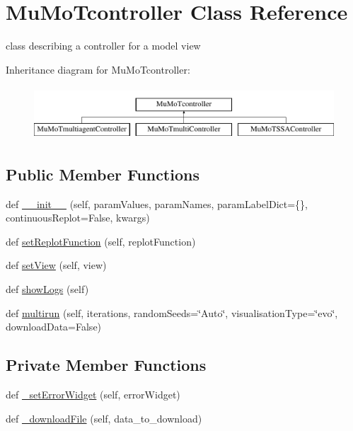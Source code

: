 \hypertarget{class_mu_mo_t_1_1_mu_mo_tcontroller}{}\section{Mu\+Mo\+Tcontroller Class Reference}
\label{class_mu_mo_t_1_1_mu_mo_tcontroller}


class describing a controller for a model view  


Inheritance diagram for Mu\+Mo\+Tcontroller\+:\begin{figure}[H]
\begin{center}
\leavevmode
\includegraphics[height=2.000000cm]{class_mu_mo_t_1_1_mu_mo_tcontroller}
\end{center}
\end{figure}
\subsection*{Public Member Functions}
\begin{DoxyCompactItemize}
\item 
def \hyperlink{class_mu_mo_t_1_1_mu_mo_tcontroller_a320992330c3f5d744e197ee09a828ac7}{\+\_\+\+\_\+init\+\_\+\+\_\+} (self, param\+Values, param\+Names, param\+Label\+Dict=\{\}, continuous\+Replot=False, kwargs)
\item 
def \hyperlink{class_mu_mo_t_1_1_mu_mo_tcontroller_aafc1e69cab41071217fe6676a8089249}{set\+Replot\+Function} (self, replot\+Function)
\item 
def \hyperlink{class_mu_mo_t_1_1_mu_mo_tcontroller_a40e22e664ecb6e379377ee1cea60073c}{set\+View} (self, view)
\item 
def \hyperlink{class_mu_mo_t_1_1_mu_mo_tcontroller_aca4d648d909f4722c7e07197675500bb}{show\+Logs} (self)
\item 
def \hyperlink{class_mu_mo_t_1_1_mu_mo_tcontroller_a1ce217feec26521a4854a69da8fddc98}{multirun} (self, iterations, random\+Seeds=\char`\"{}Auto\char`\"{}, visualisation\+Type=\char`\"{}evo\char`\"{}, download\+Data=False)
\end{DoxyCompactItemize}
\subsection*{Private Member Functions}
\begin{DoxyCompactItemize}
\item 
def \hyperlink{class_mu_mo_t_1_1_mu_mo_tcontroller_aef34ced86f7a9b37af011c0536798897}{\+\_\+set\+Error\+Widget} (self, error\+Widget)
\item 
def \hyperlink{class_mu_mo_t_1_1_mu_mo_tcontroller_ab703aa8fe14c83d5f12fa82d4e2c42d9}{\+\_\+download\+File} (self, data\+\_\+to\+\_\+download)
\end{DoxyCompactItemize}

